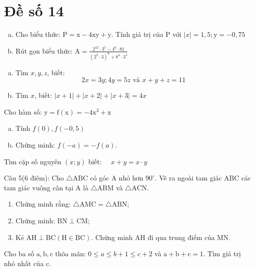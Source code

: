 \onehalfspacing
\section{Đề số 14}
\graphicspath{{./img/}}
\begin{bt} 
    \hfill
	\begin{enumerate}[a.]
		\item Cho biểu thức: $\mathrm{P}=\mathrm{x}-4 \mathrm{xy}+\mathrm{y}$. Tính giá trị của $\mathrm{P}$ với $|x|=1,5 ; \mathrm{y}=-0,75$
        \item Rút gọn biểu thức: $\mathrm{A}=\frac{2^{12} \cdot 3^5-4^6 \cdot 81}{\left(2^2 \cdot 3\right)^6+8^4 \cdot 3^5}$
	\end{enumerate}
	\loigiai{} 
\end{bt}

\begin{bt}
	\hfill
	\begin{enumerate}[a.]
		\item Tìm $x, y, z$, biết:
        $$
        2 x=3 y ; 4 y=5 z \text { và } x+y+z=11
        $$
        \item Tìm $x$, biết: $|x+1|+|x+2|+|x+3|=4 x$
	\end{enumerate}
	\loigiai{} 
\end{bt}

\begin{bt}
	Cho hàm số: $\mathrm{y}=\mathrm{f}(\mathrm{x})=-4 \mathrm{x}^3+\mathrm{x}$
	\begin{enumerate}[a.]
		\item Tính $f(0), f(-0,5)$
        \item Chứng minh: $f(-a)=-f(a)$.
	\end{enumerate}
	\loigiai{}
\end{bt}

\begin{bt}
    Tìm cặp số nguyên $(x ; y)$ biết: $\quad x+y=x \cdot y$
\loigiai{}
\end{bt}

\begin{bt}
    Câu 5(6 điêm): Cho $\triangle \mathrm{ABC}$ có góc $\mathrm{A}$ nhỏ hơn $90^{\circ}$. Vẽ ra ngoài tam giác $\mathrm{ABC}$ các tam giác vuông cân tại $\mathrm{A}$ là $\triangle \mathrm{ABM}$ và $\triangle \mathrm{ACN}$.
    \begin{enumerate} 
        \item Chứng minh rằng: $\triangle \mathrm{AMC}=\triangle \mathrm{ABN}$;
        \item Chứng minh: $\mathrm{BN} \perp \mathrm{CM}$;
        \item Kẻ $\mathrm{AH} \perp \mathrm{BC}(\mathrm{H} \in \mathrm{BC})$. Chứng minh $\mathrm{AH}$ đi qua trung điểm của $\mathrm{MN}$.
    \end{enumerate}
\loigiai{}
\end{bt}

\begin{bt}
    Cho ba số $\mathrm{a}, \mathrm{b}, \mathrm{c}$ thõa mãn: $0 \leq a \leq b+1 \leq c+2$ và $\mathrm{a}+\mathrm{b}+\mathrm{c}=1$. Tìm giá trị nhỏ nhất của c.
\loigiai{}
\end{bt}